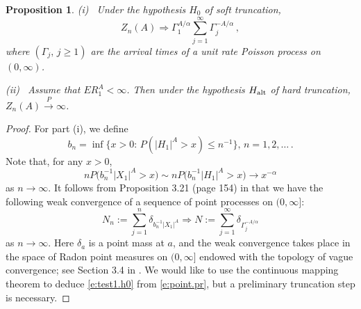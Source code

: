 \documentclass[11pt]{amsart}
\newtheorem{prop}{Proposition}[section]
\numberwithin{equation}{section}
\begin{document}
\begin{prop}\label{prop:test1} (i) \ Under the hypothesis $H_0$
  of soft truncation,
\begin{equation} \label{e:test1.h0}
Z_n(A)\Rightarrow \Gamma_1^{A/\alpha}
\sum_{j=1}^\infty \Gamma_j^{-A/\alpha}\,,
\end{equation}
where $(\Gamma_j,\, j\ge1)$ are the arrival times of a unit rate
Poisson process on $(0,\infty)$.

(ii) \ Assume that $ER_1^A<\infty$. Then under the hypothesis
$H_{\rm alt}$   of hard truncation, $Z_n(A)\stackrel P\longrightarrow\infty$.
\end{prop}
\begin{proof} For part (i), we define
$$
b_n = \inf\bigl\{ x>0:\, P(|H_1|^A>x)\leq n^{-1}\bigr\},\,
n=1,2,\ldots\,.
$$
Note that, for  any $x>0$,
$$
n P\bigl( b_n^{-1}|X_1|^A>x\bigr) \sim n P\bigl(
b_n^{-1}|H_1|^A>x\bigr) \to x^{-\alpha}
$$
as $n\to\infty$. It follows from Proposition 3.21 (page 154) in
\cite{resnick:1987} that we have the following weak convergence
of a sequence of point processes on $(0,\infty]$:
\begin{equation} \label{e:point.pr}
N_n := \sum_{j=1}^n \delta_{b_n^{-1}|X_1|^A} \Rightarrow
N := \sum_{j=1}^\infty \delta_{\Gamma_j^{-A/\alpha}}
\end{equation}
as $n\to\infty$. Here $\delta_a$ is a point mass at $a$, and the
weak convergence takes place in the space of Radon point measures
on $(0,\infty]$  endowed with the topology of vague convergence;
see Section 3.4 in \cite{resnick:1987}. We would like to use the
continuous mapping theorem to deduce \eqref{e:test1.h0} from
\eqref{e:point.pr}, but a preliminary truncation step is
necessary.


\end{proof}
\end{document}
